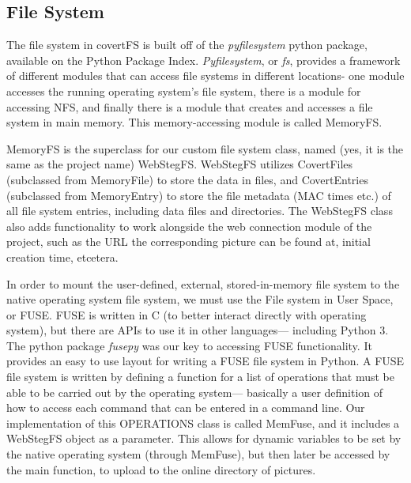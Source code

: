 \subsection{File System}

The file system in covertFS is built off of the \textit{pyfilesystem} python package, available on the Python Package Index. \textit{Pyfilesystem}, or \textit{fs}, provides a framework of different modules that can access file systems in different locations- one module accesses the running operating system's file system, there is a module for accessing NFS, and finally there is a module that creates and accesses a file system in main memory. This memory-accessing module is called MemoryFS. 

MemoryFS is the superclass for our custom file system class, named (yes, it is the same as the project name) WebStegFS. WebStegFS utilizes CovertFiles (subclassed from MemoryFile) to store the data in files, and CovertEntries (subclassed from MemoryEntry) to store the file metadata (MAC times etc.) of all file system entries, including data files and directories. The WebStegFS class also adds functionality to work alongside the web connection module of the project, such as the URL the corresponding picture can be found at, initial creation time, etcetera. 

In order to mount the user-defined, external, stored-in-memory file system to the native operating system file system, we must use the File system in User Space, or FUSE. FUSE is written in C (to better interact directly with operating system), but there are APIs to use it in other languages--- including Python 3. The python package \textit{fusepy} was our key to accessing FUSE functionality. It provides an easy to use layout for writing a FUSE file system in Python. A FUSE file system is written by defining a function for a list of operations that must be able to be carried out by the operating system--- basically a user definition of how to access each command that can be entered in a command line. Our implementation of this OPERATIONS class is called MemFuse, and it includes a WebStegFS object as a parameter. This allows for dynamic variables to be set by the native operating system (through MemFuse), but then later be accessed by the main function, to upload to the online directory of pictures.